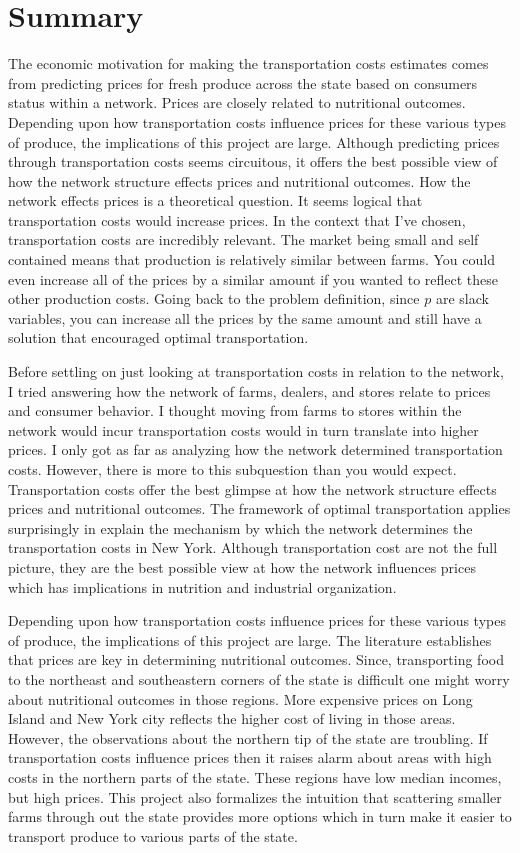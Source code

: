 \documentclass{report}
\begin{document}
\section{Summary}

The economic motivation for making the transportation costs estimates comes from predicting prices for fresh produce across the state based on consumers status within a network. Prices are closely related to nutritional outcomes. Depending upon how transportation costs influence prices for these various types of produce, the implications of this project are large. Although predicting prices through transportation costs seems circuitous, it offers the best possible view of how the network structure effects prices and nutritional outcomes. How the network effects prices is a theoretical question. It seems logical that transportation costs would increase prices. In the context that I've chosen, transportation costs are incredibly relevant. The market being small and self contained means that production is relatively similar between farms. You could even increase all of the prices by a similar amount if you wanted to reflect these other production costs. Going back to the problem definition, since $p$ are slack variables, you can  increase all the prices by the same amount and still have a solution that encouraged optimal transportation.

Before settling on just looking at transportation costs in relation to the network, I tried answering how the network of farms, dealers, and stores relate to prices and consumer behavior. I thought moving from farms to stores within the network would incur transportation costs would in turn translate into higher prices. I only got as far as analyzing how the network determined transportation costs. However, there is more to this subquestion than you would expect. Transportation costs offer the best glimpse at how the network structure effects prices and nutritional outcomes. The framework of optimal transportation applies surprisingly in explain the mechanism by which the network determines the transportation costs in New York. Although transportation cost are not the full picture, they are the best possible view at how the network influences prices which has implications in nutrition and industrial organization.

Depending upon how transportation costs influence prices for these various types of produce, the implications of this project are large. The literature establishes that prices are key in determining nutritional outcomes. Since, transporting food to the northeast and southeastern corners of the state is difficult one might worry about nutritional outcomes in those regions. More expensive prices on Long Island and New York city reflects the higher cost of living in those areas. However, the observations about the northern tip of the state are troubling. If transportation costs influence prices then it raises alarm about areas with high costs in the northern parts of the state. These regions have low median incomes, but high prices. This project also formalizes the intuition that scattering smaller farms through out the state provides more options which in turn make it easier to transport produce to various parts of the state.
\end{document}
